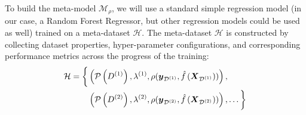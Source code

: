 To build the meta-model \( \mathcal{M}_\rho \), we will use a standard simple regression model (in our case, a Random Forest Regressor, but other regression models could be used as well) trained on a meta-dataset \( \mathcal{H} \).
The meta-dataset \( \mathcal{H} \) is constructed by collecting dataset properties, hyper-parameter configurations, and corresponding performance metrics across the progress of the training:
\begin{equation*}
	\begin{split}
		\mathcal{H} = \biggl\{ &\left( \mathcal{P} \left( D^{(1)} \right), \lambda^{(1)}, \rho( \boldsymbol{y}_{\mathcal{D}^{(1)}}, \hat{f} \left( \boldsymbol{X}_{\mathcal{D}^{(1)}} \right) ) \right), \\
		&\left( \mathcal{P} \left( D^{(2)} \right), \lambda^{(2)}, \rho( \boldsymbol{y}_{\mathcal{D}^{(2)}}, \hat{f} \left( \boldsymbol{X}_{\mathcal{D}^{(2)}} \right) ) \right), \dots \biggr\}
	\end{split}
\end{equation*}
